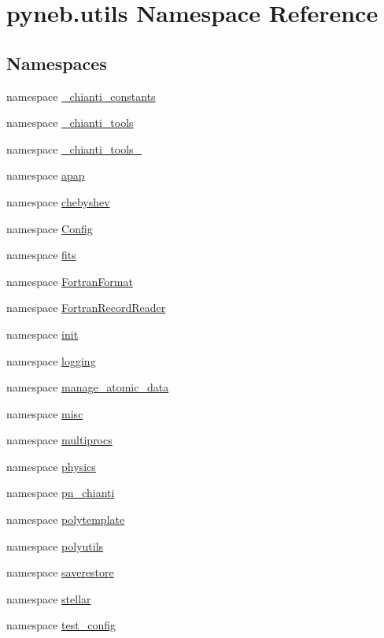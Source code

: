 \hypertarget{namespacepyneb_1_1utils}{\section{pyneb.\-utils Namespace Reference}
\label{namespacepyneb_1_1utils}
}
\subsection*{Namespaces}
\begin{DoxyCompactItemize}
\item 
namespace \hyperlink{namespacepyneb_1_1utils_1_1__chianti__constants}{\-\_\-chianti\-\_\-constants}
\item 
namespace \hyperlink{namespacepyneb_1_1utils_1_1__chianti__tools}{\-\_\-chianti\-\_\-tools}
\item 
namespace \hyperlink{namespacepyneb_1_1utils_1_1__chianti__tools__8}{\-\_\-chianti\-\_\-tools\-\_}
\item 
namespace \hyperlink{namespacepyneb_1_1utils_1_1apap}{apap}
\item 
namespace \hyperlink{namespacepyneb_1_1utils_1_1chebyshev}{chebyshev}
\item 
namespace \hyperlink{namespacepyneb_1_1utils_1_1_config}{Config}
\item 
namespace \hyperlink{namespacepyneb_1_1utils_1_1fits}{fits}
\item 
namespace \hyperlink{namespacepyneb_1_1utils_1_1_fortran_format}{Fortran\-Format}
\item 
namespace \hyperlink{namespacepyneb_1_1utils_1_1_fortran_record_reader}{Fortran\-Record\-Reader}
\item 
namespace \hyperlink{namespacepyneb_1_1utils_1_1init}{init}
\item 
namespace \hyperlink{namespacepyneb_1_1utils_1_1logging}{logging}
\item 
namespace \hyperlink{namespacepyneb_1_1utils_1_1manage__atomic__data}{manage\-\_\-atomic\-\_\-data}
\item 
namespace \hyperlink{namespacepyneb_1_1utils_1_1misc}{misc}
\item 
namespace \hyperlink{namespacepyneb_1_1utils_1_1multiprocs}{multiprocs}
\item 
namespace \hyperlink{namespacepyneb_1_1utils_1_1physics}{physics}
\item 
namespace \hyperlink{namespacepyneb_1_1utils_1_1pn__chianti}{pn\-\_\-chianti}
\item 
namespace \hyperlink{namespacepyneb_1_1utils_1_1polytemplate}{polytemplate}
\item 
namespace \hyperlink{namespacepyneb_1_1utils_1_1polyutils}{polyutils}
\item 
namespace \hyperlink{namespacepyneb_1_1utils_1_1saverestore}{saverestore}
\item 
namespace \hyperlink{namespacepyneb_1_1utils_1_1stellar}{stellar}
\item 
namespace \hyperlink{namespacepyneb_1_1utils_1_1test__config}{test\-\_\-config}
\end{DoxyCompactItemize}
